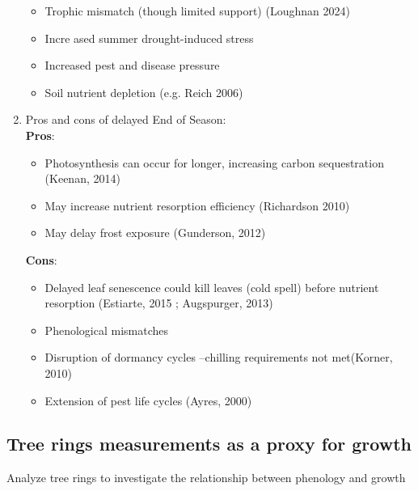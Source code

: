 \documentclass{article}
\begin{document}
\begin{enumerate}
\begin {itemize}
				\item Trophic mismatch (though limited support) (Loughnan 2024)
				\item Incre	ased summer drought-induced stress
				\item Increased pest and disease pressure
				\item Soil nutrient depletion (e.g. Reich 2006)
			\end {itemize}
	\item Pros and cons of delayed End of Season: \\
		\textbf{Pros}: 
			\begin {itemize}
				\item Photosynthesis can occur for longer, increasing carbon sequestration (Keenan, 2014) 
				\item May increase nutrient resorption efficiency (Richardson 2010)
				\item May delay frost exposure (Gunderson, 2012)
			\end {itemize}
		\textbf{Cons}: 
			\begin {itemize}
				\item Delayed leaf senescence could kill leaves (cold spell) before nutrient resorption (Estiarte, 2015 ; Augspurger, 2013)
				\item Phenological mismatches
				\item Disruption of dormancy cycles --chilling requirements not met(Korner, 2010)
				\item Extension of pest life cycles (Ayres, 2000)
			\end {itemize}
\end{enumerate}

\subsection *{Tree rings measurements as a proxy for growth}
Analyze tree rings to investigate the relationship between phenology and growth
\end{document}
